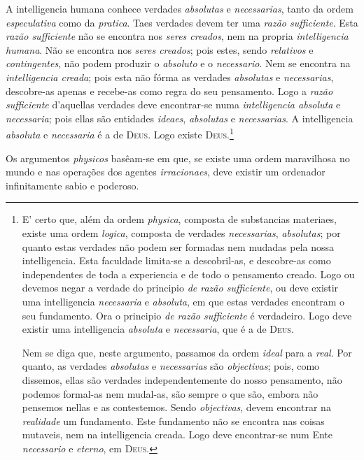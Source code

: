  A intelligencia humana conhece verdades \emph{absolutas} e \emph{necessarias},
tanto da ordem \emph{especulativa} como da \emph{pratica}. Taes verdades devem ter uma
\emph{razão sufficiente}. Esta \emph{razão sufficiente} não se encontra nos \emph{seres
creados}, nem na propria \emph{intelligencia humana}. Não se encontra nos \emph{seres
creados}; pois estes, sendo \emph{relativos} e \emph{contingentes}, não podem produzir o
\emph{absoluto} e o
 \emph{necessario}. Nem se encontra na \emph{intelligencia creada}; pois esta não
fórma as verdades \emph{absolutas} e \emph{necessarias}, descobre-as apenas e recebe-as
como regra do seu pensamento. Logo a \emph{razão sufficiente} d'aquellas verdades deve
encontrar-se numa \emph{intelligencia absoluta} e \emph{necessaria}; pois ellas são
entidades \emph{ideaes}, \emph{absolutas} e \emph{necessarias}. A intelligencia
\emph{absoluta} e \emph{necessaria} é a de \textsc{Deus}. Logo existe
\textsc{Deus}.\footnote{E' certo que, além da ordem \emph{physica}, composta de substancias materiaes, existe uma
ordem \emph{logica}, composta de verdades \emph{necessarias}, \emph{absolutas}; por
quanto estas verdades não podem ser formadas nem mudadas pela nossa intelligencia. Esta
faculdade limita-se a descobril-as, e descobre-as como independentes de toda a
experiencia e de todo o pensamento creado. Logo ou devemos negar a verdade do principio
\emph{de razão sufficiente}, ou deve existir uma intelligencia \emph{necessaria} e
\emph{absoluta}, em que estas verdades encontram o seu fundamento. Ora o principio
\emph{de razão sufficiente} é verdadeiro. Logo deve existir uma intelligencia
\emph{absoluta} e \emph{necessaria}, que é a de \textsc{Deus}.

Nem se diga que, neste argumento, passamos da ordem \emph{ideal} para a \emph{real}. Por
quanto, as verdades \emph{absolutas} e \emph{necessarias} são \emph{objectivas}; pois,
como dissemos, ellas são verdades independentemente do nosso pensamento, não podemos
formal-as nem mudal-as, são sempre o que são, embora não pensemos nellas e as
contestemos. Sendo \emph{objectivas}, devem encontrar na \emph{realidade} um fundamento.
Este fundamento não se encontra nas coisas mutaveis, nem na intelligencia creada. Logo
deve encontrar-se num Ente \emph{necessario} e \emph{eterno}, em \textsc{Deus}.}

Os argumentos \emph{physicos} basêam-se em que, se existe uma ordem maravilhosa no mundo
e nas operações dos agentes \emph{irracionaes}, deve existir um ordenador infinitamente
sabio e poderoso.

